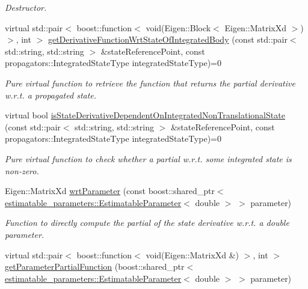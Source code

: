 \begin{DoxyCompactItemize}
\begin{DoxyCompactList}\small\item\em Destructor. \end{DoxyCompactList}\item 
virtual std\+::pair$<$ boost\+::function$<$ void(Eigen\+::\+Block$<$ Eigen\+::\+Matrix\+Xd $>$) $>$, int $>$ \hyperlink{classtudat_1_1orbit__determination_1_1StateDerivativePartial_a9b530d365f373821baa693f34bbedb4e}{get\+Derivative\+Function\+Wrt\+State\+Of\+Integrated\+Body} (const std\+::pair$<$ std\+::string, std\+::string $>$ \&state\+Reference\+Point, const propagators\+::\+Integrated\+State\+Type integrated\+State\+Type)=0
\begin{DoxyCompactList}\small\item\em Pure virtual function to retrieve the function that returns the partial derivative w.\+r.\+t. a propagated state. \end{DoxyCompactList}\item 
virtual bool \hyperlink{classtudat_1_1orbit__determination_1_1StateDerivativePartial_a0d38f73cb9d6b6e2eefaa6c879e9f839}{is\+State\+Derivative\+Dependent\+On\+Integrated\+Non\+Translational\+State} (const std\+::pair$<$ std\+::string, std\+::string $>$ \&state\+Reference\+Point, const propagators\+::\+Integrated\+State\+Type integrated\+State\+Type)=0
\begin{DoxyCompactList}\small\item\em Pure virtual function to check whether a partial w.\+r.\+t. some integrated state is non-\/zero. \end{DoxyCompactList}\item 
Eigen\+::\+Matrix\+Xd \hyperlink{classtudat_1_1orbit__determination_1_1StateDerivativePartial_a9c8dcc6a48da21e30c95af8763b3a3e3}{wrt\+Parameter} (const boost\+::shared\+\_\+ptr$<$ \hyperlink{classtudat_1_1estimatable__parameters_1_1EstimatableParameter}{estimatable\+\_\+parameters\+::\+Estimatable\+Parameter}$<$ double $>$ $>$ parameter)
\begin{DoxyCompactList}\small\item\em Function to directly compute the partial of the state derivative w.\+r.\+t. a double parameter. \end{DoxyCompactList}\item 
virtual std\+::pair$<$ boost\+::function$<$ void(Eigen\+::\+Matrix\+Xd \&) $>$, int $>$ \hyperlink{classtudat_1_1orbit__determination_1_1StateDerivativePartial_a7cb295f87ba66fc5fd06f824d57a986b}{get\+Parameter\+Partial\+Function} (boost\+::shared\+\_\+ptr$<$ \hyperlink{classtudat_1_1estimatable__parameters_1_1EstimatableParameter}{estimatable\+\_\+parameters\+::\+Estimatable\+Parameter}$<$ double $>$ $>$ parameter)

\end{DoxyCompactItemize}
